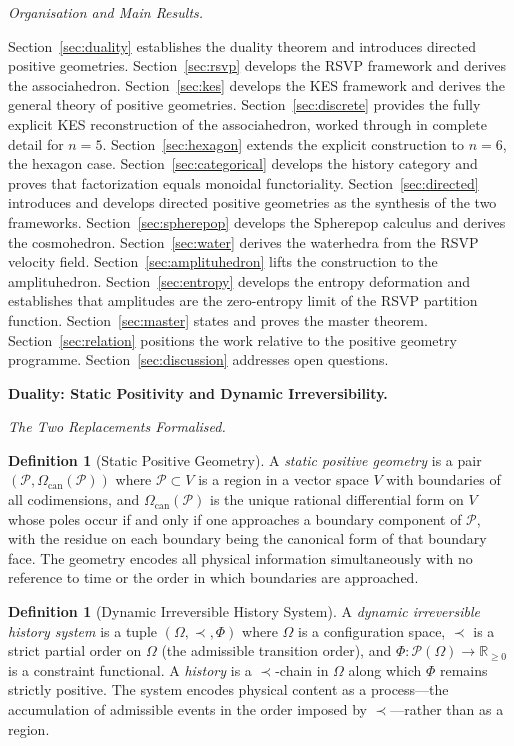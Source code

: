 \documentclass[11pt]{article}
\theoremstyle{plain}
\theoremstyle{definition}
\newtheorem{definition}[theorem]{Definition}
\theoremstyle{remark}
\newcommand{\R}{\mathbb{R}}
\newcommand{\Phif}{\Phi}
\newcommand{\OmKS}{\Omega}
\newcommand{\CF}{\Omega_{\mathrm{can}}}
\begin{document}
\medskip\noindent\textit{Organisation and Main Results.}

Section~\ref{sec:duality} establishes the duality theorem and introduces directed positive geometries. Section~\ref{sec:rsvp} develops the RSVP framework and derives the associahedron. Section~\ref{sec:kes} develops the KES framework and derives the general theory of positive geometries. Section~\ref{sec:discrete} provides the fully explicit KES reconstruction of the associahedron, worked through in complete detail for $n=5$. Section~\ref{sec:hexagon} extends the explicit construction to $n=6$, the hexagon case. Section~\ref{sec:categorical} develops the history category and proves that factorization equals monoidal functoriality. Section~\ref{sec:directed} introduces and develops directed positive geometries as the synthesis of the two frameworks. Section~\ref{sec:spherepop} develops the Spherepop calculus and derives the cosmohedron. Section~\ref{sec:water} derives the waterhedra from the RSVP velocity field. Section~\ref{sec:amplituhedron} lifts the construction to the amplituhedron. Section~\ref{sec:entropy} develops the entropy deformation and establishes that amplitudes are the zero-entropy limit of the RSVP partition function. Section~\ref{sec:master} states and proves the master theorem. Section~\ref{sec:relation} positions the work relative to the positive geometry programme. Section~\ref{sec:discussion} addresses open questions.

\bigskip\noindent\textbf{Duality: Static Positivity and Dynamic Irreversibility.}
\label{sec:duality}

\medskip\noindent\textit{The Two Replacements Formalised.}

\begin{definition}[Static Positive Geometry]
A \emph{static positive geometry} is a pair $(\mathcal{P}, \CF(\mathcal{P}))$ where $\mathcal{P} \subset V$ is a region in a vector space $V$ with boundaries of all codimensions, and $\CF(\mathcal{P})$ is the unique rational differential form on $V$ whose poles occur if and only if one approaches a boundary component of $\mathcal{P}$, with the residue on each boundary being the canonical form of that boundary face. The geometry encodes all physical information simultaneously with no reference to time or the order in which boundaries are approached.
\end{definition}

\begin{definition}[Dynamic Irreversible History System]
A \emph{dynamic irreversible history system} is a tuple $(\OmKS, \prec, \Phif)$ where $\OmKS$ is a configuration space, $\prec$ is a strict partial order on $\OmKS$ (the admissible transition order), and $\Phif: \mathcal{P}(\OmKS) \to \R_{\geq 0}$ is a constraint functional. A \emph{history} is a $\prec$-chain in $\OmKS$ along which $\Phif$ remains strictly positive. The system encodes physical content as a process---the accumulation of admissible events in the order imposed by $\prec$---rather than as a region.
\end{definition}
\end{document}

